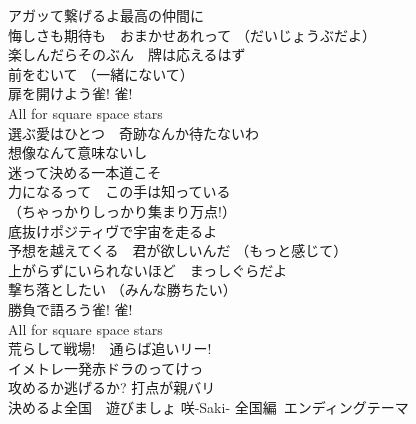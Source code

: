 {アガッて繋げるよ最高の仲間に\\
悔しさも期待も　おまかせあれって （だいじょうぶだよ）\\
楽しんだらそのぶん　牌は応えるはず\\
前をむいて （一緒にないて）\\
扉を開けよう雀! 雀!\\
All for square space stars\\

選ぶ愛はひとつ　奇跡なんか待たないわ\\
想像なんて意味ないし\\
迷って決める一本道こそ\\
力になるって　この手は知っている\\
（ちゃっかりしっかり集まり万点!）\\

底抜けポジティヴで宇宙を走るよ\\
予想を越えてくる　君が欲しいんだ （もっと感じて）\\
上がらずにいられないほど　まっしぐらだよ\\
撃ち落としたい （みんな勝ちたい）\\
勝負で語ろう雀! 雀!\\
All for square space stars\\

荒らして戦場!　通らば追いリー!\\
イメトレ一発赤ドラのってけっ\\
攻めるか逃げるか? 打点が親バリ\\
決めるよ全国　遊びましょ
}
{咲-Saki- 全国編~エンディングテーマ}
